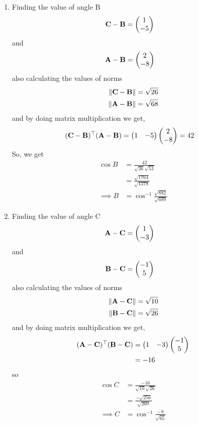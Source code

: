 \documentclass[11pt]{book}
\begin{document}
\begin{enumerate}[label=\thesection.\arabic*.,ref=\thesection.\theenumi]
\begin{enumerate}
\item Finding the value of angle B
\begin{align}
 \mathbf{C}-\mathbf{B} &=\begin{pmatrix}1\\-5\end{pmatrix}
\end{align}
and 
\begin{align}
 \mathbf{A}-\mathbf{B} &= \begin{pmatrix}2\\-8\end{pmatrix}
\end{align}
also calculating the values of norms
\begin{align}
 \left\lVert\mathbf{C}-\mathbf{B}\right\rVert &= \sqrt{26} \\
 \left\lVert\mathbf{A}-\mathbf{B}\right\rVert &= \sqrt{68}
\end{align}
and by doing matrix multiplication we get,
\begin{align}
\begin{split}
 (\mathbf{C}-\mathbf{B})^{\top}(\mathbf{A}-\mathbf{B}) &= \begin{pmatrix}1&-5\end{pmatrix}\begin{pmatrix}2\\-8\end{pmatrix} = 42
\end{split}
\end{align}
So, we get 
\begin{align}
	\cos{B} &= \frac{42}{\sqrt{26} \sqrt{53}}\\
 &= \frac{\sqrt{1764}}{\sqrt{1378}}\\
 \implies B& = \cos^{-1}{\frac{\sqrt{882}}{\sqrt{689}}}
\end{align}

\item Finding the value of angle C
\begin{align}
 \mathbf{A}-\mathbf{C} &=\begin{pmatrix}1\\-3\end{pmatrix}
\end{align}
and 
\begin{align}
 \mathbf{B}-\mathbf{C} &= \begin{pmatrix}-1\\5\end{pmatrix}
\end{align}
also calculating the values of norms
\begin{align}
 \left\lVert\mathbf{A}-\mathbf{C}\right\rVert &= \sqrt{10}\\
	\left\lVert\mathbf{B}-\mathbf{C}\right\rVert &= \sqrt{26}
\end{align}
and by doing matrix multiplication we get,
\begin{align}
\begin{split}
 (\mathbf{A}-\mathbf{C})^{\top}(\mathbf{B}-\mathbf{C}) &= \begin{pmatrix}1&-3\end{pmatrix}\begin{pmatrix}-1\\5\end{pmatrix}\\
 &= -16
\end{split}
\end{align}
so 
\begin{align}
	\cos{C} &= \frac{-16}{{\sqrt{10}} \sqrt{26}}\\
 &= \frac{-\sqrt{256}}{\sqrt{260}}\\
 \implies C &= \cos^{-1}{\frac{-8}{\sqrt{65}}}
\end{align}
\end{enumerate}

\latexprintindex

\end{enumerate}
\end{document}
